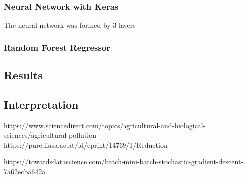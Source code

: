 \subsubsection{Neural Network with Keras}
The neural network was formed by 3 layers
\subsubsection{Random Forest Regressor}

\subsection{Results}
\subsection{Interpretation}

https://www.sciencedirect.com/topics/agricultural-and-biological-sciences/agricultural-pollution 
https://pure.iiasa.ac.at/id/eprint/14769/1/Reduction%

https://towardsdatascience.com/batch-mini-batch-stochastic-gradient-descent-7a62ecba642a